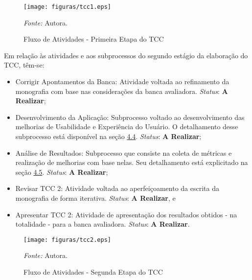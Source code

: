 \pagebreak

\begin{figure}[h]
	\centering
	\caption{Fluxo de Atividades - Primeira Etapa do TCC}
	\begin{adjustbox}{center}
		\texttt{[image: figuras/tcc1.eps]}
	\end{adjustbox}
	\begin{tablenotes}[flushleft]
		\centering
		\item \textit{Fonte:} Autora.
	  \end{tablenotes}
	\label{fig04}
\end{figure}
Em relação às atividades e aos subprocessos do segundo estágio da elaboração do TCC, têm-se:

\begin{itemize}
	\item Corrigir Apontamentos da Banca: Atividade voltada ao refinamento da monografia com base nas considerações da banca avaliadora. \textit{Status}: \textbf{A Realizar};
	\item Desenvolvimento da Aplicação: Subprocesso voltado ao desenvolvimento das melhorias de Usabilidade e Experiência do Usuário. O detalhamento desse subprocesso está disponível na seção \hyperref[sec:Metodologia de Desenvolvimento]{4.4}. \textit{Status}: \textbf{A Realizar};
	\item Análise de Resultados: Subprocesso que consiste na coleta de métricas e realização de melhorias com base nelas. Seu detalhamento está explicitado na seção \hyperref[sec:Metodologia de Analise de Resultados]{4.5}. \textit{Status}: \textbf{A Realizar};
	\item Revisar TCC 2: Atividade voltada ao aperfeiçoamento da escrita da monografia de forma iterativa. \textit{Status}: \textbf{A Realizar}, e
	\item Apresentar TCC 2: Atividade de apresentação dos resultados obtidos - na totalidade - para a banca avaliadora. \textit{Status}: \textbf{A Realizar}.
\end{itemize}


\begin{figure}[h]
	\centering
	\caption{Fluxo de Atividades - Segunda Etapa do TCC}
	\begin{adjustbox}{center}
		\texttt{[image: figuras/tcc2.eps]}
	\end{adjustbox}
	\begin{tablenotes}[flushleft]
		\centering
		\item \textit{Fonte:} Autora.
	  \end{tablenotes}
	\label{fig05}
\end{figure}

